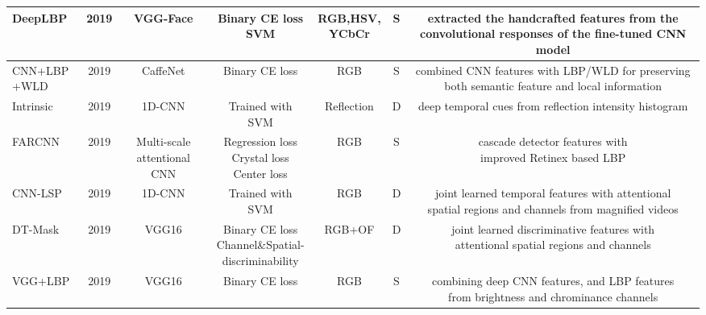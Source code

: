 \documentclass[10pt,journal,compsoc]{IEEEtran}
\begin{document}
\begin{table}
{\begin{tabular}{l c c c c c c}
   \midrule
DeepLBP~\cite{li2019face} & 2019 & VGG-Face & \tabincell{c}{Binary CE loss\\SVM} & \tabincell{c}{RGB,HSV,\\YCbCr} & S & \tabincell{c}{extracted the handcrafted features from the\\ convolutional responses of the fine-tuned CNN model}  \\  



   \midrule
\tabincell{c}{CNN+LBP\\+WLD}~\cite{khammari2019robust} & 2019 & CaffeNet & Binary CE loss & RGB & S & \tabincell{c}{combined CNN features with LBP/WLD for preserving \\both semantic feature and local information}  \\  

   \midrule
Intrinsic~\cite{li20203d} & 2019 & 1D-CNN & Trained with SVM & Reflection & D & deep temporal cues from reflection intensity histogram  \\  

   \midrule
FARCNN~\cite{chen2019cascade} & 2019 & \tabincell{c}{Multi-scale \\attentional CNN}  & \tabincell{c}{Regression loss\\Crystal loss\\ Center loss} & RGB & S & \tabincell{c}{cascade detector features with \\improved Retinex based LBP}  \\  

   \midrule
CNN-LSP~\cite{li2019replayed} & 2019 & 1D-CNN & Trained with SVM & RGB & D &  \tabincell{c}{joint learned temporal features with attentional \\spatial regions and channels from magnified videos}  \\  

   \midrule
DT-Mask~\cite{shao2018joint} & 2019 & VGG16  & \tabincell{c}{Binary CE loss\\Channel\&Spatial-\\ discriminability} & RGB+OF & D & \tabincell{c}{joint learned discriminative features with \\attentional spatial regions and channels}  \\  

   \midrule
VGG+LBP~\cite{das2019new} & 2019 & VGG16 & Binary CE loss & RGB & S &  \tabincell{c}{combining deep CNN features, and LBP features\\ from brightness and chrominance channels}  \\  


\end{tabular}}
\end{table}
\end{document}
